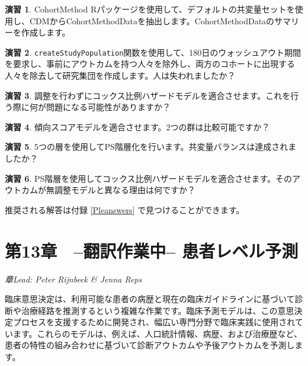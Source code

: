 \documentclass[
  11pt]{book}
\theoremstyle{definition}
\theoremstyle{definition}
\theoremstyle{definition}
\newtheorem{exercise}{演習}[chapter]
\theoremstyle{definition}
\theoremstyle{remark}
\begin{document}
\begin{exercise}
\protect\hypertarget{exr:exercisePle1}{}\label{exr:exercisePle1}CohortMethod Rパッケージを使用して、デフォルトの共変量セットを使用し、CDMからCohortMethodDataを抽出します。CohortMethodDataのサマリーを作成します。
\end{exercise}

\begin{exercise}
\protect\hypertarget{exr:exercisePle2}{}\label{exr:exercisePle2}\texttt{createStudyPopulation}関数を使用して、180日のウォッシュアウト期間を要求し、事前にアウトカムを持つ人々を除外し、両方のコホートに出現する人々を除去して研究集団を作成します。人は失われましたか？
\end{exercise}

\begin{exercise}
\protect\hypertarget{exr:exercisePle3}{}\label{exr:exercisePle3}調整を行わずにコックス比例ハザードモデルを適合させます。これを行う際に何が問題になる可能性がありますか？
\end{exercise}

\begin{exercise}
\protect\hypertarget{exr:exercisePle4}{}\label{exr:exercisePle4}傾向スコアモデルを適合させます。2つの群は比較可能ですか？
\end{exercise}

\begin{exercise}
\protect\hypertarget{exr:exercisePle5}{}\label{exr:exercisePle5}5つの層を使用してPS階層化を行います。共変量バランスは達成されましたか？
\end{exercise}

\begin{exercise}
\protect\hypertarget{exr:exercisePle6}{}\label{exr:exercisePle6}PS階層を使用してコックス比例ハザードモデルを適合させます。そのアウトカムが無調整モデルと異なる理由は何ですか？
\end{exercise}

推奨される解答は付録 \ref{Pleanswers} で見つけることができます。

\chapter{第13章　--翻訳作業中-- 患者レベル予測}\label{PatientLevelPrediction}

\emph{章Lead: Peter Rijnbeek \& Jenna Reps}


臨床意思決定は、利用可能な患者の病歴と現在の臨床ガイドラインに基づいて診断や治療経路を推測するという複雑な作業です。臨床予測モデルは、この意思決定プロセスを支援するために開発され、幅広い専門分野で臨床実践に使用されています。これらのモデルは、例えば、人口統計情報、病歴、および治療歴など、患者の特性の組み合わせに基づいて診断アウトカムや予後アウトカムを予測します。   
\end{document}

